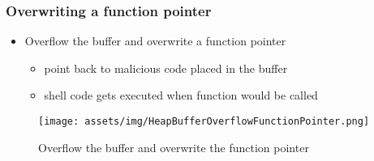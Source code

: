 \documentclass[12pt,titlepage,a4paper]{report}
\begin{document}
				\subsubsection{Overwriting a function pointer}
					\begin{itemize}
						\item Overflow the buffer and overwrite a function pointer
						\begin{itemize}
							\item point back to malicious code placed in the buffer
							\item shell code gets executed when function would be called
						\end{itemize}
					\end{itemize}

					\begin{figure}[h]
						\centering
						\texttt{[image: assets/img/HeapBufferOverflowFunctionPointer.png]}
						\caption{\label{img:heapBufferOverflowFuncionPointer}Overflow the buffer and overwrite the function pointer}
					\end{figure}
				
\end{document}
